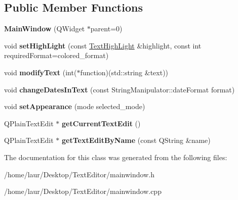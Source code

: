 \subsection*{Public Member Functions}
\begin{DoxyCompactItemize}
\item 
\mbox{\label{class_main_window_a8b244be8b7b7db1b08de2a2acb9409db}} 
{\bfseries Main\+Window} (Q\+Widget $\ast$parent=0)
\item 
\mbox{\label{class_main_window_abf335cb9ff46aa274bc09c331aa5f897}} 
void {\bfseries set\+High\+Light} (const \hyperlink{class_text_high_light}{Text\+High\+Light} \&highlight, const int required\+Format=colored\+\_\+format)
\item 
\mbox{\label{class_main_window_a35ffd96169163c809eb8c11f2dedda28}} 
void {\bfseries modify\+Text} (int($\ast$function)(std\+::string \&text))
\item 
\mbox{\label{class_main_window_a28f0773e43cc100fa5dc6019b09780bb}} 
void {\bfseries change\+Dates\+In\+Text} (const String\+Manipulator\+::date\+Format format)
\item 
\mbox{\label{class_main_window_a059e8c7deed9f985c6396182779590f2}} 
void {\bfseries set\+Appearance} (mode selected\+\_\+mode)
\item 
\mbox{\label{class_main_window_a6cdeb56a312f6b1935436e6203912c09}} 
Q\+Plain\+Text\+Edit $\ast$ {\bfseries get\+Current\+Text\+Edit} ()
\item 
\mbox{\label{class_main_window_a61d74ea396ffe9c23581f19a3e8368af}} 
Q\+Plain\+Text\+Edit $\ast$ {\bfseries get\+Text\+Edit\+By\+Name} (const Q\+String \&name)
\end{DoxyCompactItemize}


The documentation for this class was generated from the following files\+:\begin{DoxyCompactItemize}
\item 
/home/laur/\+Desktop/\+Text\+Editor/mainwindow.\+h\item 
/home/laur/\+Desktop/\+Text\+Editor/mainwindow.\+cpp\end{DoxyCompactItemize}
